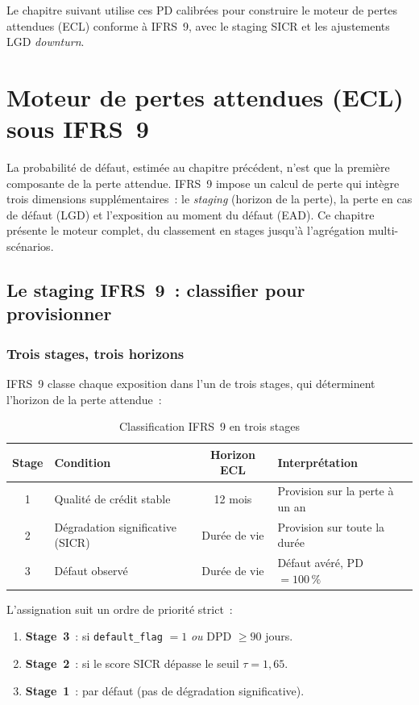 \documentclass[12pt, a4paper, twoside, openright]{report}
\theoremstyle{definition}
\begin{document}
Le chapitre suivant utilise ces PD calibrées pour construire le moteur de pertes attendues (ECL) conforme à IFRS~9, avec le staging SICR et les ajustements LGD \emph{downturn}.


\chapter{Moteur de pertes attendues (ECL) sous IFRS~9}
\label{chap:ecl}

La probabilité de défaut, estimée au chapitre précédent, n'est que la première composante de la perte attendue. IFRS~9 impose un calcul de perte qui intègre trois dimensions supplémentaires~: le \emph{staging} (horizon de la perte), la perte en cas de défaut (LGD) et l'exposition au moment du défaut (EAD). Ce chapitre présente le moteur complet, du classement en stages jusqu'à l'agrégation multi-scénarios.

\section{Le staging IFRS~9~: classifier pour provisionner}
\label{sec:ecl:staging}

\subsection{Trois stages, trois horizons}

IFRS~9 classe chaque exposition dans l'un de trois stages, qui déterminent l'horizon de la perte attendue~:

\begin{table}[htbp]
\centering
\caption{Classification IFRS~9 en trois stages}
\label{tab:stages}
\begin{tabular}{clcl}
\toprule
Stage & Condition & Horizon ECL & Interprétation \\
\midrule
1 & Qualité de crédit stable & 12 mois & Provision sur la perte à un an \\
2 & Dégradation significative (SICR) & Durée de vie & Provision sur toute la durée \\
3 & Défaut observé & Durée de vie & Défaut avéré, PD $= 100\,\%$ \\
\bottomrule
\end{tabular}
\end{table}

L'assignation suit un ordre de priorité strict~:
\begin{enumerate}[nosep]
  \item \textbf{Stage~3}~: si \texttt{default\_flag} $= 1$ \emph{ou} DPD $\geq 90$ jours.
  \item \textbf{Stage~2}~: si le score SICR dépasse le seuil $\tau = 1{,}65$.
  \item \textbf{Stage~1}~: par défaut (pas de dégradation significative).
\end{enumerate}
\end{document}
